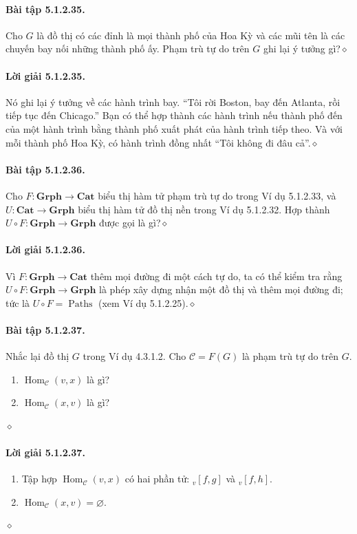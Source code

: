 \paragraph{Bài tập 5.1.2.35.} Cho $G$ là đồ thị có các đỉnh là mọi thành phố của Hoa Kỳ và các mũi tên là các chuyến bay nối những thành phố ấy. Phạm trù tự do trên $G$ ghi lại ý tưởng gì?\hfill$\diamond$
\paragraph{Lời giải 5.1.2.35.} Nó ghi lại ý tưởng về các hành trình bay. ``Tôi rời Boston, bay đến Atlanta, rồi tiếp tục đến Chicago.'' Bạn có thể hợp thành các hành trình nếu thành phố đến của một hành trình bằng thành phố xuất phát của hành trình tiếp theo. Và với mỗi thành phố Hoa Kỳ, có hành trình đồng nhất ``Tôi không đi đâu cả''.\hfill$\diamond$
\paragraph{Bài tập 5.1.2.36.} Cho $F:\mathbf{Grph}\to\mathbf{Cat}$ biểu thị hàm tử phạm trù tự do trong Ví dụ 5.1.2.33, và $U:\mathbf{Cat}\to\mathbf{Grph}$ biểu thị hàm tử đồ thị nền trong Ví dụ 5.1.2.32. Hợp thành $U\circ F:\mathbf{Grph}\to\mathbf{Grph}$ được gọi là gì?\hfill$\diamond$
\paragraph{Lời giải 5.1.2.36.} Vì $F:\mathbf{Grph}\to\mathbf{Cat}$ thêm mọi đường đi một cách tự do, ta có thể kiểm tra rằng $U\circ F:\mathbf{Grph}\to\mathbf{Grph}$ là phép xây dựng nhận một đồ thị và thêm mọi đường đi; tức là $U\circ F=\operatorname{Paths}$ (xem Ví dụ 5.1.2.25).\hfill$\diamond$
\paragraph{Bài tập 5.1.2.37.} Nhắc lại đồ thị $G$ trong Ví dụ 4.3.1.2. Cho $\mathcal C=F(G)$ là phạm trù tự do trên $G$.
\begin{enumerate}[label=\alph*.]\item $\operatorname{Hom}_{\mathcal C}(v,x)$ là gì?\item $\operatorname{Hom}_{\mathcal C}(x,v)$ là gì?\end{enumerate}\hfill$\diamond$
\paragraph{Lời giải 5.1.2.37.}
\begin{enumerate}[label=\alph*.]\item Tập hợp $\operatorname{Hom}_{\mathcal C}(v,x)$ có hai phần tử: ${}_{v}[f,g]$ và ${}_{v}[f,h]$.\item $\operatorname{Hom}_{\mathcal C}(x,v)=\varnothing$.\end{enumerate}\hfill$\diamond$
